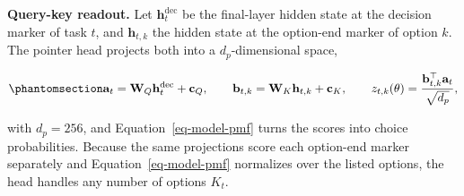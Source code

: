 \documentclass[
  11pt,
  letterpaper,
]{article}
\begin{document}
\textbf{Query-key readout.} Let \(\mathbf{h}_t^{\mathrm{dec}}\) be the
final-layer hidden state at the decision marker of task \(t\), and
\(\mathbf{h}_{t,k}\) the hidden state at the option-end marker of option
\(k\). The pointer head projects both into a \(d_p\)-dimensional space,

\begin{equation}\protect\phantomsection\label{eq-pointer-readout}{
\mathbf{a}_t = \mathbf{W}_Q \mathbf{h}_t^{\mathrm{dec}} + \mathbf{c}_Q, \qquad
\mathbf{b}_{t,k} = \mathbf{W}_K \mathbf{h}_{t,k} + \mathbf{c}_K, \qquad
z_{t,k}(\theta) = \frac{\mathbf{b}_{t,k}^{\top} \mathbf{a}_t}{\sqrt{d_p}},
}\end{equation}

with \(d_p = 256\), and Equation~\ref{eq-model-pmf} turns the scores
into choice probabilities. Because the same projections score each
option-end marker separately and Equation~\ref{eq-model-pmf} normalizes
over the listed options, the head handles any number of options \(K_t\).
\end{document}
